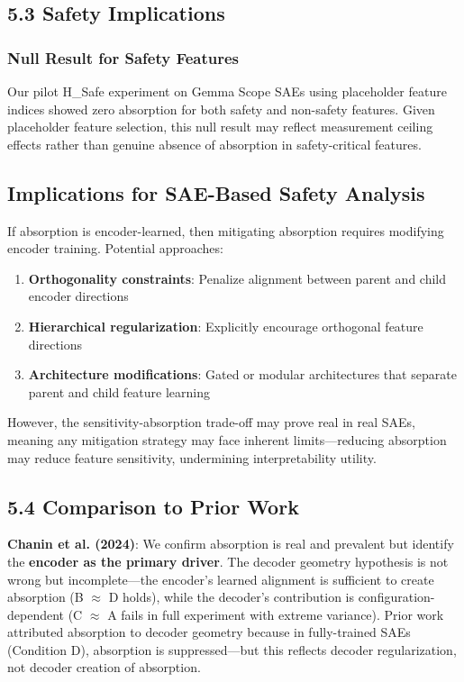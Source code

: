 \documentclass{article}
\begin{document}
\subsection{5.3 Safety Implications}

\subsubsection{Null Result for Safety Features}

Our pilot H\_Safe experiment on Gemma Scope SAEs using placeholder feature indices showed zero absorption for both safety and non-safety features. Given placeholder feature selection, this null result may reflect measurement ceiling effects rather than genuine absence of absorption in safety-critical features.

\subsection{Implications for SAE-Based Safety Analysis}

If absorption is encoder-learned, then mitigating absorption requires modifying encoder training. Potential approaches:

\begin{enumerate}
\item \textbf{Orthogonality constraints}: Penalize alignment between parent and child encoder directions
\item \textbf{Hierarchical regularization}: Explicitly encourage orthogonal feature directions
\item \textbf{Architecture modifications}: Gated or modular architectures that separate parent and child feature learning
\end{enumerate}

However, the sensitivity-absorption trade-off may prove real in real SAEs, meaning any mitigation strategy may face inherent limits---reducing absorption may reduce feature sensitivity, undermining interpretability utility.

\subsection{5.4 Comparison to Prior Work}

\textbf{Chanin et al. (2024)}: We confirm absorption is real and prevalent but identify the \textbf{encoder as the primary driver}. The decoder geometry hypothesis is not wrong but incomplete---the encoder's learned alignment is sufficient to create absorption (B $\approx$ D holds), while the decoder's contribution is configuration-dependent (C $\approx$ A fails in full experiment with extreme variance). Prior work attributed absorption to decoder geometry because in fully-trained SAEs (Condition D), absorption is suppressed---but this reflects decoder regularization, not decoder creation of absorption.
\end{document}

